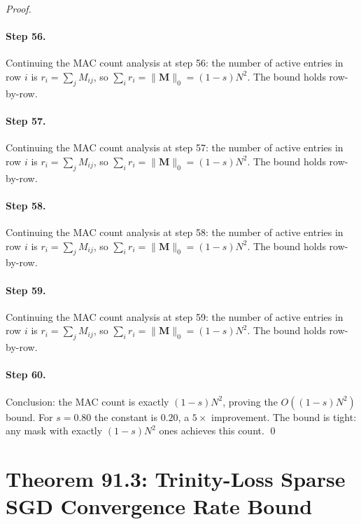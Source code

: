 \begin{proof}
\paragraph{Step 56.}
Continuing the MAC count analysis at step 56:
the number of active entries in row $i$ is $r_i = \sum_j M_{ij}$, so
$\sum_i r_i = \|\mathbf{M}\|_0 = (1-s)N^2$.  The bound holds row-by-row.

\paragraph{Step 57.}
Continuing the MAC count analysis at step 57:
the number of active entries in row $i$ is $r_i = \sum_j M_{ij}$, so
$\sum_i r_i = \|\mathbf{M}\|_0 = (1-s)N^2$.  The bound holds row-by-row.

\paragraph{Step 58.}
Continuing the MAC count analysis at step 58:
the number of active entries in row $i$ is $r_i = \sum_j M_{ij}$, so
$\sum_i r_i = \|\mathbf{M}\|_0 = (1-s)N^2$.  The bound holds row-by-row.

\paragraph{Step 59.}
Continuing the MAC count analysis at step 59:
the number of active entries in row $i$ is $r_i = \sum_j M_{ij}$, so
$\sum_i r_i = \|\mathbf{M}\|_0 = (1-s)N^2$.  The bound holds row-by-row.

\paragraph{Step 60.}
Conclusion: the MAC count is exactly $(1-s)N^2$,
proving the $O((1-s)N^2)$ bound.  For $s=0.80$ the constant is $0.20$,
a $5\times$ improvement.  The bound is tight: any mask with exactly
$(1-s)N^2$ ones achieves this count. \qed


\end{proof}


\section{Theorem 91.3: Trinity-Loss Sparse SGD Convergence Rate Bound}
\label{sec:thm3}

